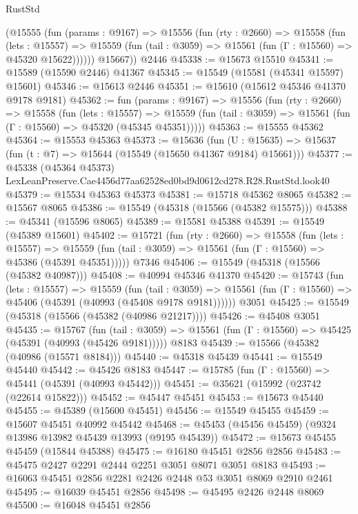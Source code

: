 \begin{lexlean}{RustStd}
\begin{coremodule}
        (@15555
          (fun (params : @9167) =>
          @15556
            (fun (rty : @2660) =>
            @15558
              (fun (lets : @15557) =>
              @15559 (fun (tail : @3059) => @15561 (fun (Γ : @15560) => @45320 @15622))))))
        @15667))
    @2446
@45338 := @15673 @15510
@45341 := @15589 (@15590 @2446) @41367
@45345 := @15549 (@15581 (@45341 @15597) @15601)
@45346 := @15613 @2446
@45351 := @15610 (@15612 @45346 @41370 @9178 @9181)
@45362 := fun (params : @9167) =>
  @15556
    (fun (rty : @2660) =>
    @15558
      (fun (lets : @15557) =>
      @15559 (fun (tail : @3059) => @15561 (fun (Γ : @15560) => @45320 (@45345 @45351)))))
@45363 := @15555 @45362
@45364 := @15553 @45363
@45373 := @15636
    (fun (U : @15635) => @15637 (fun (t : @7) => @15644 (@15549 (@15650 @41367 @9184) @15661)))
@45377 := @45338
    (@45364 @45373)
    LexLeanPreserve.Cae4456d77aa62528ed0bd9d0612cd278.R28.RustStd.look40
@45379 := @15534 @45363 @45373
@45381 := @15718 @45362 @8065
@45382 := @15567 @8065
@45386 := @15549 (@45318 (@15566 (@45382 @15575)))
@45388 := @45341 (@15596 @8065)
@45389 := @15581 @45388
@45391 := @15549 (@45389 @15601)
@45402 := @15721
    (fun (rty : @2660) =>
    @15558
      (fun (lets : @15557) =>
      @15559 (fun (tail : @3059) => @15561 (fun (Γ : @15560) => @45386 (@45391 @45351)))))
    @7346
@45406 := @15549 (@45318 (@15566 (@45382 @40987)))
@45408 := @40994 @45346 @41370
@45420 := @15743
    (fun (lets : @15557) =>
    @15559
      (fun (tail : @3059) =>
      @15561 (fun (Γ : @15560) => @45406 (@45391 (@40993 (@45408 @9178 @9181))))))
    @3051
@45425 := @15549 (@45318 (@15566 (@45382 (@40986 @21217))))
@45426 := @45408 @3051
@45435 := @15767
    (fun (tail : @3059) => @15561 (fun (Γ : @15560) => @45425 (@45391 (@40993 (@45426 @9181)))))
    @8183
@45439 := @15566 (@45382 (@40986 (@15571 @8184)))
@45440 := @45318 @45439
@45441 := @15549 @45440
@45442 := @45426 @8183
@45447 := @15785 (fun (Γ : @15560) => @45441 (@45391 (@40993 @45442)))
@45451 := @35621 (@15992 (@23742 (@22614 @15822)))
@45452 := @45447 @45451
@45453 := @15673 @45440
@45455 := @45389 (@15600 @45451)
@45456 := @15549 @45455
@45459 := @15607 @45451 @40992 @45442
@45468 := @45453 (@45456 @45459) (@9324 @13986 @13982 @45439 @13993 (@9195 @45439))
@45472 := @15673 @45455 @45459 (@15844 @45388)
@45475 := @16180 @45451 @2856 @2856
@45483 := @45475 @2427 @2291 @2444 @2251 @3051 @8071 @3051 @8183
@45493 := @16063 @45451 @2856 @2281 @2426 @2448 @53 @3051 @8069 @2910 @2461
@45495 := @16039 @45451 @2856
@45498 := @45495 @2426 @2448 @8069
@45500 := @16048 @45451 @2856

\end{coremodule}
\end{lexlean}
